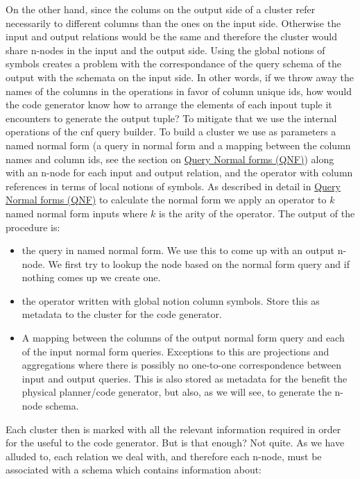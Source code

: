 On the other hand, since the colums on the output side of a cluster
refer necessarily to different columns than the ones on the input
side. Otherwise the input and output relations would be the same and
therefore the cluster would share n-nodes in the input and the output
side. Using the global notions of symbols creates a problem with the
correspondance of the query schema of the output with the schemata on
the input side. In other words, if we throw away the names of the
columns in the operations in favor of column unique ids, how would the
code generator know how to arrange the elements of each inpout tuple
it encounters to generate the output tuple? To mitigate that we use
the internal operations of the cnf query builder. To build a cluster
we use as parameters a named normal form (a query in normal form and a
mapping between the column names and column ids, see the section on
\hyperref[sec:org9e7f455]{Query Normal forms (QNF)}) along with an n-node for each input and
output relation, and the operator with column references in terms of
local notions of symbols. As described in detail in \hyperref[sec:org9e7f455]{Query Normal forms
  (QNF)} to calculate the normal form we apply an operator to \(k\) named
normal form inputs where \(k\) is the arity of the operator. The output
of the procedure is:

\begin{itemize}
\item the query in named normal form. We use this to come up with an
  output n-node. We first try to lookup the node based on the
  normal form query and if nothing comes up we create one.
\item the operator written with global notion column symbols. Store
  this as metadata to the cluster for the code generator.
\item A mapping between the columns of the output normal form query and
  each of the input normal form queries. Exceptions to this are
  projections and aggregations where there is possibly no
  one-to-one correspondence between input and output queries. This
  is also stored as metadata for the benefit the physical
  planner/code generator, but also, as we will see, to generate the
  n-node schema.
\end{itemize}

Each cluster then is marked with all the relevant information
required in order for the useful to the code generator. But is that
enough? Not quite. As we have alluded to, each relation we deal
with, and therefore each n-node, must be associated with a schema
which contains information about:

